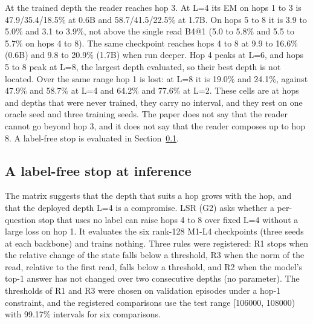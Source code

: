\begin{table}[htbp]
\centering\footnotesize
\caption{Qwen3-0.6B-Base: seed-mean EM (\%) of the M1-L4 checkpoint by evaluation depth $L$ and hop (primary setting, rank 128). The last row gives the best depth in parentheses.  %
}
\label{tab:matrixA}
\gtMatrixSmall
\end{table}

\begin{table}[htbp]
\centering\footnotesize
\caption{Qwen3-1.7B-Base: the same matrix.  %
}
\label{tab:matrixB}
\gtMatrixLarge
\end{table}

At the trained depth the reader reaches hop 3.
At L=4 its EM on hops 1 to 3 is 47.9/35.4/18.5\% at 0.6B and 58.7/41.5/22.5\% at 1.7B.
On hops 5 to 8 it is 3.9 to 5.0\% and 3.1 to 3.9\%, not above the single read B4@1 (5.0 to 5.8\% and 5.5 to 5.7\% on hops 4 to 8).  %
The same checkpoint reaches hops 4 to 8 at 9.9 to 16.6\% (0.6B) and 9.8 to 20.9\% (1.7B) when run deeper.
Hop 4 peaks at L=6, and hops 5 to 8 peak at L=8, the largest depth evaluated, so their best depth is not located.
Over the same range hop 1 is lost: at L=8 it is 19.0\% and 24.1\%, against 47.9\% and 58.7\% at L=4 and 64.2\% and 77.6\% at L=2.  %
These cells are at hops and depths that were never trained, they carry no interval, and they rest on one oracle seed and three training seeds.
The paper does not say that the reader cannot go beyond hop 3, and it does not say that the reader composes up to hop 8.
A label-free stop is evaluated in Section~\ref{sec:stop}.

\subsection{A label-free stop at inference}
\label{sec:stop}

The matrix suggests that the depth that suits a hop grows with the hop, and that the deployed depth L=4 is a compromise.
LSR (G2) asks whether a per-question stop that uses no label can raise hops 4 to 8 over fixed L=4 without a large loss on hop 1.
It evaluates the six rank-128 M1-L4 checkpoints (three seeds at each backbone) and trains nothing.
Three rules were registered: R1 stops when the relative change of the state falls below a threshold, R3 when the norm of the read, relative to the first read, falls below a threshold, and R2 when the model's top-1 answer has not changed over two consecutive depths (no parameter).
The thresholds of R1 and R3 were chosen on validation episodes under a hop-1 constraint, and the registered comparisons use the test range [106000, 108000) with 99.17\% intervals for six comparisons.  %

